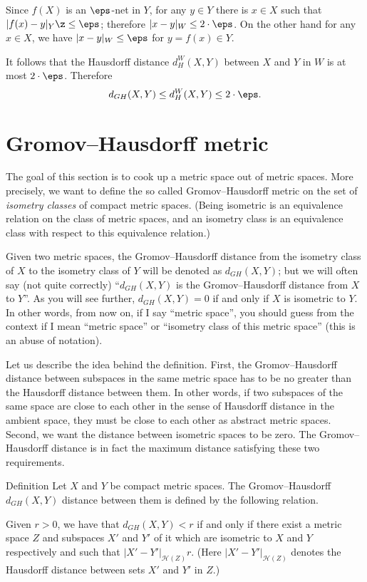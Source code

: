 Since $f(X)$ is an $\eps$-net in $Y$,
for any $y\in Y$ there is $x\in X$ such that $|f(x)-y|_Y\z\le\eps$;
therefore $|x-y|_W\le 2\cdot\eps$.
On the other hand for any $x\in X$, we have $|x-y|_W\le\eps$
for $y=f(x)\in Y$.

It follows that the Hausdorff distance $d_{H}^W(X,Y)$ between $X$ and $Y$ in $W$ is at most $2\cdot\eps$.
Therefore
$$d_{GH}(X,Y)\le d_{H}^W(X,Y)\le 2\cdot\eps.$$
\qedsf













\section{Gromov--Hausdorff metric}

The goal of this section is to cook up a metric space out of metric spaces.
More precisely, we want to define the so called  Gromov--Hausdorff metric on the set of \emph{isometry classes} of compact metric spaces.
(Being isometric is an equivalence relation on the class of metric spaces, 
and an isometry class is an equivalence class with respect to this equivalence relation.)

Given two metric spaces, the Gromov--Hausdorff distance from the isometry class of $X$ 
to the isometry class of $Y$ will be denoted as $d_{GH}(X,Y)$;
but we will often say (not quite correctly) 
``$d_{GH}(X,Y)$ is the Gromov--Hausdorff distance from  $X$ 
to  $Y$''.
As you will see further, $d_{GH}(X,Y)=0$ if and only if $X$ is isometric to $Y$.
In other words, from now on, if I say ``metric space'',
you should guess from the context if I mean ``metric space'' 
or ``isometry class of this metric space'' (this is an abuse of notation).

Let us describe the idea behind
the definition. 
First, the Gromov--Hausdorff distance between subspaces in
the same metric space has to be no greater than the Hausdorff distance between
them. 
In other words, if two subspaces of the same space are close to each
other in the sense of Hausdorff distance in the ambient space, they must be
close to each other as abstract metric spaces. 
Second, we want
the distance between isometric spaces to be zero. 
The Gromov--Hausdorff
distance is in fact the maximum distance satisfying these two requirements.


\begin{thm}{Definition}\label{def:GH}
Let $X$ and $Y$ be compact metric spaces. 
The Gromov--Hausdorff $d_{GH}(X, Y )$
distance between them is defined by the following
relation.
 
Given  $r > 0$, we have that $d_{GH}(X, Y ) < r$ if and only if there exist a metric
space $Z$ and subspaces $X'$ and $Y'$ of it which are isometric to $X$ and $Y$
respectively and such that $|X'-Y'|_{\mathcal{H}(Z)} r$. 
(Here $|X'-Y'|_{\mathcal{H}(Z)}$ denotes the Hausdorff distance between sets $X'$ and $Y'$ in $Z$.)
\end{thm}

